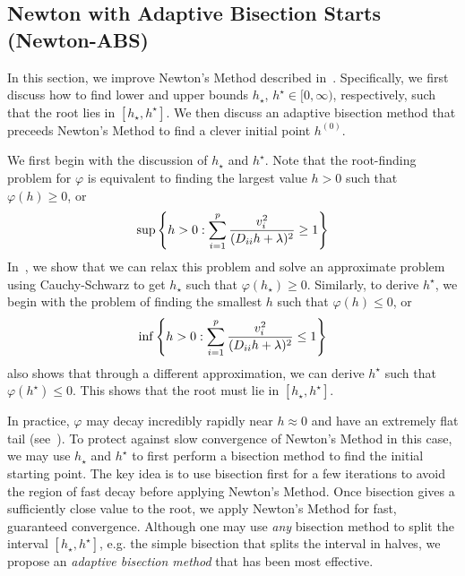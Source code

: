 \subsection{Newton with Adaptive Bisection Starts (Newton-ABS)}\label{ssec:newton-abs}

In this section, we improve Newton's Method described in~.
Specifically, we first discuss how to find lower and upper bounds $h_\star$, $h^\star \in [0,\infty)$,
respectively, such that the root lies in $[h_\star, h^\star]$.
We then discuss an adaptive bisection method that preceeds Newton's Method
to find a clever initial point $h^{(0)}$.

We first begin with the discussion of $h_\star$ and $h^\star$.
Note that the root-finding problem for $\varphi$
is equivalent to finding the largest value $h > 0$ such that $\varphi(h) \geq 0$, or
\begin{align}
    \sup\left\{
        h > 0 :
        \sum\limits_{i=1}^p
        \frac{v_i^2}{(D_{ii} h + \lambda)^2}
        \geq
        1
    \right\}
    \label{eq:newton-abs:lower-bound-problem}
\end{align}
In~, we show that we can relax this problem
and solve an approximate problem using Cauchy-Schwarz
to get $h_\star$ such that $\varphi(h_\star) \geq 0$.
Similarly, to derive $h^\star$, we begin with the problem of finding the smallest $h$ such that
$\varphi(h) \leq 0$, or
\begin{align}
    \inf\left\{
        h > 0
        :
        \sum\limits_{i=1}^p
        \frac{v_i^2}{(D_{ii} h + \lambda)^2}
        \leq
        1
    \right\}
    \label{eq:newton-abs:upper-bound-problem}
\end{align}
 also shows that through a different approximation,
we can derive $h^\star$ such that $\varphi(h^\star) \leq 0$.
This shows that the root must lie in $[h_\star, h^\star]$.

In practice, $\varphi$ may decay incredibly rapidly near $h \approx 0$ and have an extremely flat tail
(see~).
To protect against slow convergence of Newton's Method in this case,
we may use $h_\star$ and $h^\star$ to first perform a bisection method to find the initial starting point.
The key idea is to use bisection first for a few iterations 
to avoid the region of fast decay before applying Newton's Method.
Once bisection gives a sufficiently close value to the root, 
we apply Newton's Method for fast, guaranteed convergence.
Although one may use \emph{any} bisection method to split the interval $[h_\star, h^\star]$,
e.g. the simple bisection that splits the interval in halves,
we propose an \emph{adaptive bisection method} that has been most effective.

